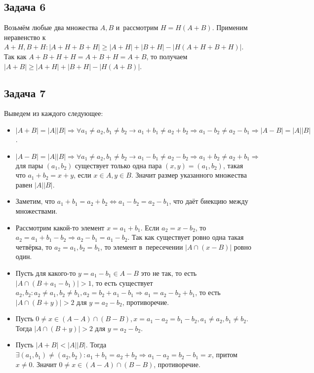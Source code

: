 \documentclass{article}
\begin{document}
\subsection*{Задача 6}
	Возьмём любые два множества $A, B$ и~рассмотрим $H = H(A + B)$. Применим
	неравенство к~$A + H, B + H: |A + H + B + H| \ge |A + H| + |B + H| - |H(A + H
	+ B + H)|$. Так как $A + B + H + H = A + B + H = A + B$, то получаем $|A + B|
	\ge |A + H| + |B + H| - |H(A + B)|$.

\subsection*{Задача 7}
	Выведем из каждого следующее:
	\begin{itemize}
		\item $|A + B| = |A||B| \Rightarrow \forall a_1 \ne a_2, b_1 \ne b_2
			\rightarrow a_1 + b_1 \ne a_2 + b_2 \Rightarrow a_1 - b_2 \ne a_2 - b_1
			\Rightarrow |A - B| = |A||B|$.
		\item $|A - B| = |A||B| \Rightarrow \forall a_1 \ne a_2, b_1 \ne b_2
			\rightarrow a_1 - b_1 \ne a_2 - b_2 \Rightarrow a_1 + b_2 \ne a_2 + b_1
			\Rightarrow$ для пары $(a_1, b_2)$ существует только одна пара $(x, y) =
			(a_1, b_2)$, такая что $a_1 + b_2 = x + y$, если $x \in A, y \in B$.
			Значит размер указанного множества равен $|A||B|$.
		\item Заметим, что $a_1 + b_1 = a_2 + b_2 \Leftrightarrow a_1 - b_2 = a_2 -
			b_1$, что даёт биекцию между множествами.
		\item Рассмотрим какой-то элемент $x = a_1 + b_1$. Если $a_2 = x - b_2$, то
			$a_2 = a_1 + b_1 - b_2 \Rightarrow a_2 - b_1 = a_1 - b_2$. Так как
			существует ровно одна такая четвёрка, то $a_2 = a_1, b_2 = b_1$, то
			элемент в~пересечении $|A \cap (x - B)|$ ровно один.
		\item Пусть для какого-то $y = a_1 - b_1 \in A - B$ это не так, то есть $|A
			\cap (B + a_1 - b_1)| > 1$, то есть существует $a_2, b_2: a_2 \ne a_1, b_2
			\ne b_1, a_2 = b_2 + a_1 - b_1 \Rightarrow a_1 = a_2 - b_2 + b_1$, то есть
			$|A \cap (B + y)| > 2$ для $y = a_2 - b_2$, противоречие.
		\item Пусть $0 \ne x \in (A - A) \cap (B - B), x = a_1 - a_2 = b_1 - b_2,
			a_1 \ne a_2, b_1 \ne b_2$. Тогда $|A \cap (B + y)| > 2$ для $y = a_2 -
			b_2$.
		\item Пусть $|A + B| < |A||B|$. Тогда $\exists (a_1, b_1) \ne (a_2, b_2):
			a_1 + b_1 = a_2 + b_2 \Rightarrow a_1 - a_2 = b_2 - b_1 = x$, притом $x
			\ne 0$. Значит $0 \ne x \in (A - A) \cap (B - B)$, противоречие.
	\end{itemize}
\end{document}
